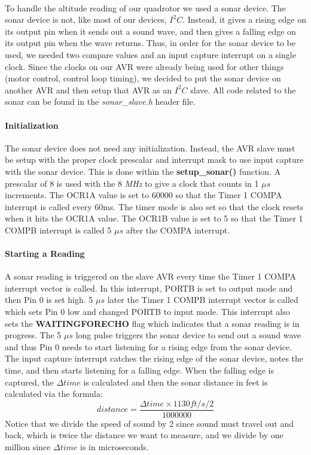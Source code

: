\paragraph{}
To handle the altitude reading of our quadrotor we used a sonar device.  The sonar device is not, like most of our devices, $I^{2}C$.  Instead, it gives a rising edge on its output pin when it sends out a sound wave, and then gives a falling edge on its output pin when the wave returns.  Thus, in order for the sonar device to be used, we needed two compare values and an input capture interrupt on a single clock.  Since the clocks on our AVR were already being used for other things (motor control, control loop timing), we decided to put the sonar device on another AVR and then setup that AVR as an $I^{2}C$ slave.  All code related to the sonar can be found in the {\it sonar\_slave.h} header file.

\paragraph{Initialization}
The sonar device does not need any initialization.  Instead, the AVR slave must be setup with the proper clock prescalar and interrupt mask to use input capture with the sonar device.  This is done within the {\bf setup\_sonar()} function.  A prescalar of 8 is used with the 8 {\it MHz} to give a clock that counts in 1 $\mu s$ increments.  The OCR1A value is set to 60000 so that the Timer 1 COMPA interrupt is called every 60ms.  The timer mode is also set so that the clock resets when it hits the OCR1A value.  The OCR1B value is set to 5 so that the Timer 1 COMPB interrupt is called 5 $\mu s$ after the COMPA interrupt.

\paragraph{Starting a Reading}
A sonar reading is triggered on the slave AVR every time the Timer 1 COMPA interrupt vector is called.  In this interrupt, PORTB is set to output mode and then Pin 0 is set high.  5 $\mu s$ later the Timer 1 COMPB interrupt vector is called which sets Pin 0 low and changed PORTB to input mode.  This interrupt also sets the {\bf WAITINGFORECHO} flag which indicates that a sonar reading is in progress.  The 5 $\mu s$ long pulse triggers the sonar device to send out a sound wave and thus Pin 0 needs to start listening for a rising edge from the sonar device.  The input capture interrupt catches the rising edge of the sonar device, notes the time, and then starts listening for a falling edge.  When the falling edge is captured, the $\Delta time$ is calculated and then the sonar distance in feet is calculated via the formula:
\begin{equation}
distance = \frac{\Delta time \times 1130 ft/s / 2}{1000000}
\end{equation}
Notice that we divide the speed of sound by 2 since sound must travel out and back, which is twice the distance we want to measure, and we divide by one million since $\Delta time$ is in microseconds.
